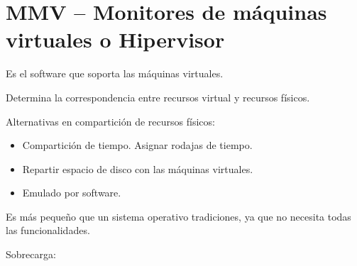 \documentclass[12pt, twoside, openright]{report} %
\begin{document}
\section{MMV -- Monitores de máquinas virtuales o Hipervisor}
\begin{figure}[H]
	{\def\svgwidth{.7\textwidth}
  }
\end{figure}
  

    Es el software que soporta las máquinas virtuales.

    
  Determina la correspondencia entre recursos virtual y recursos
  físicos.

 
  
    Alternativas en compartición de recursos físicos:

    \begin{itemize}
    
    \item
      Compartición de tiempo. Asignar rodajas de tiempo.
    \item
      Repartir espacio de disco con las máquinas virtuales.
    \item
      Emulado por software.
    \end{itemize}

    Es más pequeño que un sistema operativo tradiciones, ya que no
    necesita todas las funcionalidades.

    Sobrecarga:
\end{document}
